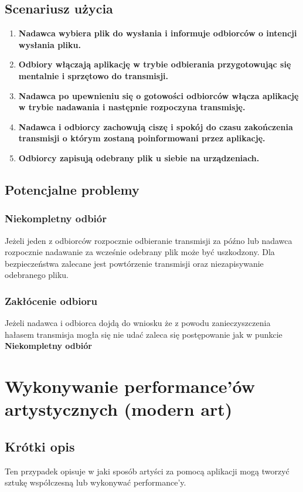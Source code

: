\documentclass{article}
\begin{document}
\subsection{Scenariusz użycia}
\begin{enumerate}
	\normalfont \item \bf Nadawca \normalfont wybiera plik do wysłania i informuje \bf odbiorców \normalfont o intencji wysłania pliku.
	\item \bf Odbiory \normalfont włączają aplikację w trybie odbierania przygotowując się mentalnie i sprzętowo do transmisji.
	\item \bf Nadawca \normalfont po upewnieniu się o gotowości \bf odbiorców \normalfont włącza aplikację w trybie nadawania i następnie rozpoczyna transmisję.
	\item \bf Nadawca \normalfont i \bf odbiorcy \normalfont zachowują ciszę i spokój do czasu zakończenia transmisji o którym zostaną poinformowani przez aplikację.
	\item \bf Odbiorcy \normalfont zapisują odebrany plik u siebie na urządzeniach.
\end{enumerate}

\subsection{Potencjalne problemy}
\subsubsection{Niekompletny odbiór}
\normalfont
Jeżeli jeden z odbiorców rozpocznie odbieranie transmisji za późno lub nadawca rozpocznie nadawanie za wcześnie odebrany plik może być uszkodzony. Dla bezpieczeństwa zalecane jest powtórzenie transmisji oraz niezapisywanie odebranego pliku.
\subsubsection{Zakłócenie odbioru}
\normalfont
Jeżeli nadawca i odbiorca dojdą do wniosku że z powodu zanieczyszczenia hałasem transmisja mogła się nie udać zaleca się postępowanie jak w punkcie \bf Niekompletny odbiór \normalfont


\newpage
\section{Wykonywanie performance'ów artystycznych (modern art)}
\subsection{Krótki opis}
Ten przypadek opisuje w jaki sposób artyści za pomocą aplikacji mogą tworzyć sztukę współczesną lub wykonywać performance'y.
\end{document}
